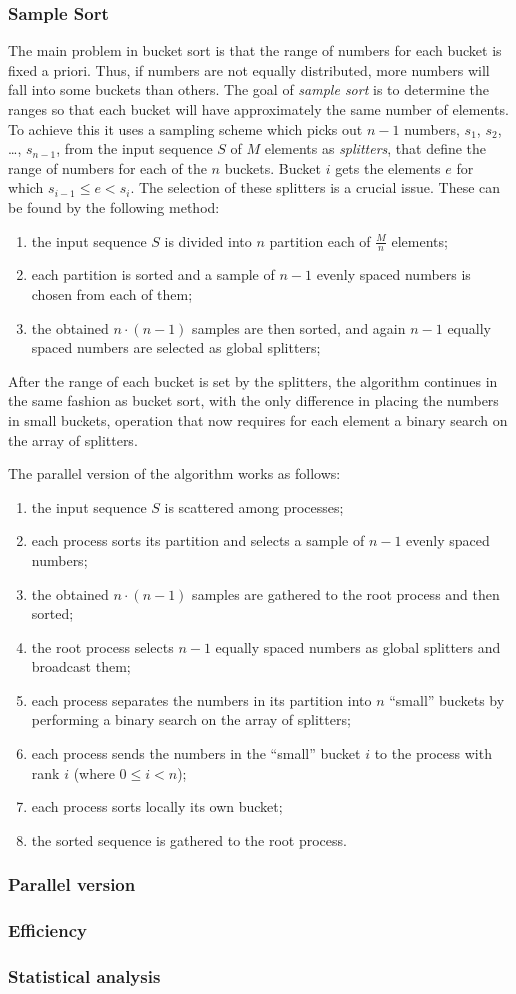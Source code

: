 \subsubsection{Sample Sort}
The main problem in bucket sort is that the range of numbers for each bucket is fixed a priori. Thus, if numbers are not equally distributed, more numbers will fall into some buckets than others.
The goal of \textit{sample sort} is to determine the ranges so that each bucket will have approximately the same number of elements. To achieve this it uses a sampling scheme which picks out $n-1$ numbers, $s_1$, $s_2$, \dots, $s_{n-1}$, from the input sequence $S$ of $M$ elements as \textit{splitters}, that define the range of numbers for each of the $n$ buckets. Bucket $i$ gets the elements $e$ for which $s_{i-1} \leq e < s_i$. The selection of these splitters is a crucial issue. These can be found by the following method:
\begin{enumerate}	
	\item the input sequence $S$ is divided into $n$ partition each of $\frac{M}{n}$ elements;
	\item each partition is sorted and a sample of $n-1$ evenly spaced numbers is chosen from each of them;
	\item the obtained $n \cdot (n-1)$ samples are then sorted, and again $n-1$ equally spaced numbers are selected as global splitters;
\end{enumerate}
After the range of each bucket is set by the splitters, the algorithm continues in the same fashion as bucket sort, with the only difference in placing the numbers in small buckets, operation that now requires for each element a binary search on the array of splitters.

The parallel version of the algorithm works as follows:
\begin{enumerate}	
	\item the input sequence $S$ is scattered among processes;
	\item each process sorts its partition and selects a sample of $n-1$ evenly spaced numbers;
	\item the obtained $n \cdot (n-1)$ samples are gathered to the root process and then sorted;
	\item the root process selects $n-1$ equally spaced numbers as global splitters and broadcast them;
	\item each process separates the numbers in its partition into $n$ ``small'' buckets by performing a binary search on the array of splitters;
	\item each process sends the numbers in the ``small'' bucket $i$ to the process with rank $i$ (where $0 \leq i < n$);
	\item each process sorts locally its own bucket;
	\item the sorted sequence is gathered to the root process.
\end{enumerate}

 

\subsubsection*{Parallel version}
\subsubsection*{Efficiency} 
\subsubsection*{Statistical analysis}